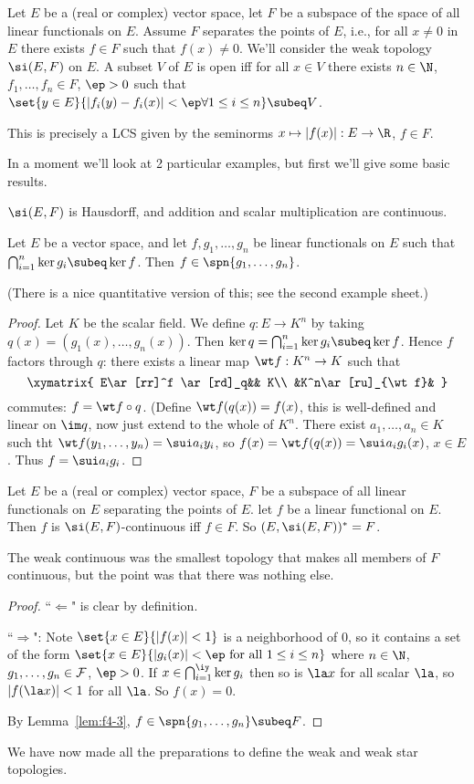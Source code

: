 Let $E$ be a (real or complex) vector space, let $F$ be a subspace of the space of all linear functionals on $E$. Assume $F$ separates the points of $E$, i.e., for all $x\ne 0$ in $E$ there exists $f\in F$ such that $f(x)\ne 0$. We'll consider the weak topology $\si(E,F)$ on $E$. A subset $V$ of $E$ is open iff for all $x\in V$ there exists $n\in \N$, $f_1,\ldots, f_n\in F$, $\ep>0$ such that $\set{y\in E}{|f_i(y)-f_i(x)|<\ep\forall 1\le i\le n}\subeq V$.

This is precisely a LCS given by the seminorms $x\mapsto |f(x)|:E\to \R$, $f\in F$.

In a moment we'll look at 2 particular examples, but first we'll give some basic results.

$\si(E,F)$ is Hausdorff, and addition and scalar multiplication are continuous.
\begin{lem}
Let $E$ be a vector space, and let $f,g_1,\ldots, g_n$ be linear functionals on $E$ such that $\bigcap_{i=1}^n \ker g_i\subeq \ker f$. Then $f\in \spn\{g_1,\ldots, g_n\}$. 
\end{lem}
(There is a nice quantitative version of this; see the second example sheet.)
\begin{proof}
Let $K$ be the scalar field. We define $q:E\to K^n$ by taking $q(x)=(g_1(x),\ldots, g_n(x))$. Then $\ker q=\bigcap_{i=1}^n \ker g_i\subeq \ker f$. Hence $f$ factors through $q$: there exists a linear map $\wt f:K^n\to K$ such that
\[
\xymatrix{
E\ar[rr]^f \ar[rd]_q&& K\\
&K^n\ar[ru]_{\wt f}&
}
\]
commutes: $f=\wt f\circ q$. (Define $\wt f(q(x))=f(x)$, this is well-defined and linear on $\im q$, now just extend to the whole of $K^n$. There exist $a_1,\ldots, a_n\in K$ such tht $\wt f(y_1,\ldots, y_n)=\sui a_iy_i$, so $f(x)=\wt f(q(x))=\sui a_ig_i(x)$, $x\in E$. Thus $f=\sui a_ig_i$. 
\end{proof}
\begin{pr}
Let $E$ be a (real or complex) vector space, $F$ be a subspace of all linear functionals on $E$ separating the points of $E$. let $f$ be a linear functional on $E$. Then $f$ is $\si(E,F)$-continuous iff $f\in F$.  So $(E,\si(E,F))^*=F$.
\end{pr}
The weak continuous was the smallest topology that makes all members of $F$ continuous, but the point was that there was nothing else.
\begin{proof}
``$\Leftarrow$" is clear by definition.

``$\Rightarrow$": Note $\set{x\in E}{|f(x)|<1}$ is a neighborhood of 0, so it contains a set of the form $\set{x\in E}{|g_i(x)|<\ep\text{ for all } 1\le i\le n}$ where $n\in \N$, $g_1,\ldots, g_n\in \cal F$, $\ep>0$. If $x\in \bigcap_{i=1}^{\iy} \ker g_i$ then so is $\la x$ for all scalar $\la$, so $|f(\la x)|<1$ for all $\la$. So $f(x)=0$. 

By Lemma~\ref{lem:f4-3}, $f\in \spn\{g_1,\ldots, g_n\}\subeq F$.
\end{proof}
We have now made all the preparations to define the weak and weak star topologies.

